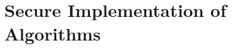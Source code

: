 \section{Secure Implementation of Algorithms}\label{sec:security_of_cryptographic_algorithms}
\vspace{7.5cm}





\vspace{-1.5mm}
\newpage
